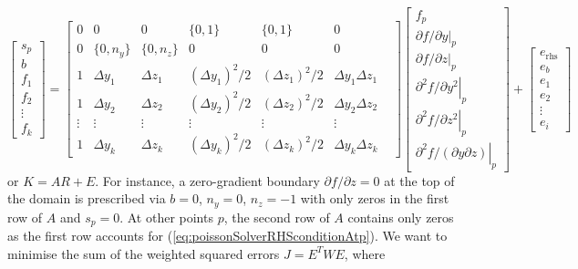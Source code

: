 \documentclass{article}
\begin{document}
\begin{equation} \label{eq:poissonSystem}
\begin{bmatrix}
s_p \\ 
b      \\ 
f_1      \\ 
f_2      \\ 
\vdots \\
f_k      
\end{bmatrix}
=
\begin{bmatrix}
0 & 0        & 0        & \{0, 1\}            & \{0, 1\}            & 0 \\
0 &  \{0, n_y\}        & \{0, n_z\}        & 0            & 0            & 0 \\
1 & \Delta y_1 & \Delta z_1 & (\Delta y_1)^2/2 & (\Delta z_1)^2/2 & \Delta y_1 \Delta z_1 \\
1 & \Delta y_2 & \Delta z_2 & (\Delta y_2)^2/2 & (\Delta z_2)^2/2 & \Delta y_2 \Delta z_2 \\
\vdots & \vdots & \vdots & \vdots & \vdots & \vdots & \\
1 & \Delta y_k & \Delta z_k & (\Delta y_k)^2/2 & (\Delta z_k)^2/2 & \Delta y_k \Delta z_k 
\end{bmatrix}
\begin{bmatrix}
f_p \\ 
\left. \partial f/\partial y     \right|_p  \\ 
\left. \partial f/\partial z     \right|_p  \\ 
\left. \partial ^2f/\partial y^2 \right|_p  \\ 
\left. \partial ^2f/\partial z^2 \right|_p  \\
\left. \partial ^2f/(\partial y\partial z) \right|_p 
\end{bmatrix}
+
\begin{bmatrix}
e_{\mathrm{rhs}} \\
e_b \\
e_1 \\
e_2 \\
\vdots \\
e_i
\end{bmatrix}
\end{equation}
or $K=A R + E$.
For instance, a zero-gradient boundary 
$\partial f / \partial z = 0$ at the top of the domain is prescribed via $b=0$, $n_y=0$, $n_z=-1$ with only zeros in the first row of $A$ and $s_p=0$.
At other points $p$, the second row of $A$ contains only zeros as the first row accounts for (\ref{eq:poissonSolverRHSconditionAtp}).
We want to minimise the sum of the weighted squared errors $J=E^T W E$, where
\end{document}
